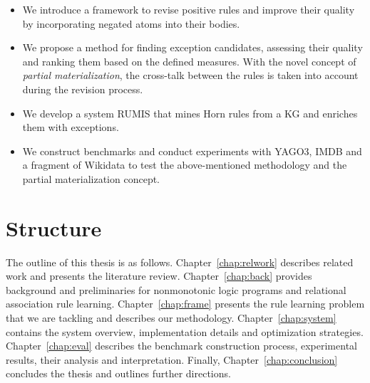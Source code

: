 \begin{itemize}
\item We introduce a framework to revise positive rules and improve their quality by incorporating negated atoms into their bodies.
\item We propose a method for finding exception candidates, assessing their quality and ranking them based on the defined measures. With the novel concept of \textit{partial materialization}, the cross-talk between the rules is taken into account during the revision process.
\item We develop a system RUMIS that mines Horn rules from a KG and enriches them with exceptions.
\item We construct benchmarks and conduct experiments with YAGO3, IMDB and a fragment of Wikidata to test the above-mentioned methodology and the partial materialization concept.
\end{itemize}

\section{Structure}

The outline of this thesis is as follows. Chapter~\ref{chap:relwork} describes related work and presents the literature review. Chapter~\ref{chap:back} provides background and preliminaries for nonmonotonic logic programs and relational association rule learning. Chapter~\ref{chap:frame} presents the rule learning problem that we are tackling and describes our methodology. Chapter~\ref{chap:system} contains the system overview, implementation details and optimization strategies. Chapter~\ref{chap:eval} describes the benchmark construction process, experimental results, their analysis and interpretation. Finally, Chapter~\ref{chap:conclusion} concludes the thesis and outlines further directions.